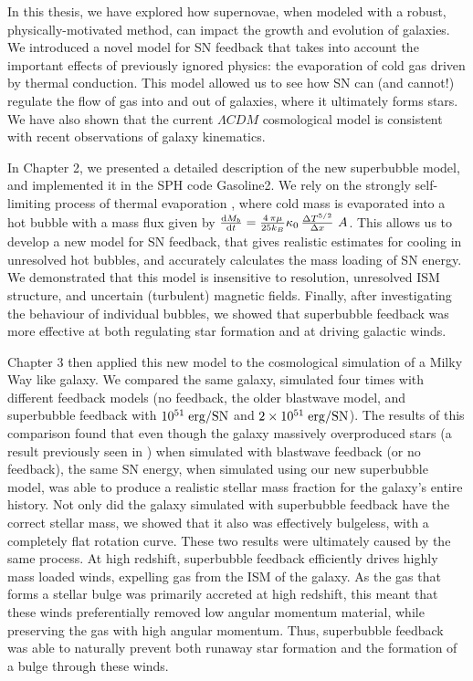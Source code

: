 In this thesis, we have explored how supernovae, when modeled with a robust,
physically-motivated method, can impact the growth and evolution of galaxies.
We introduced a novel model for SN feedback that takes into account the
important effects of previously ignored physics: the evaporation of cold gas
driven by thermal conduction.  This model allowed us to see how SN can (and
cannot!) regulate the flow of gas into and out of galaxies, where it ultimately
forms stars.  We have also shown that the current $\Lambda CDM$ cosmological
model is consistent with recent observations of galaxy kinematics.

In Chapter 2, we presented a detailed description of the new superbubble model,
and implemented it in the SPH code {\sc Gasoline2}.  We rely on the strongly
self-limiting process of thermal evaporation \citep{Cowie1977}, where cold mass
is evaporated into a hot bubble with a mass flux given by $ \frac{{\rm d
}M_b}{{\rm d}t} = \frac{4\,\pi\mu}{25k_B}\kappa_0\,\frac{\Delta T^{5/2}}{\Delta
x}\ A$. This allows us to develop a new model for SN feedback, that gives
realistic estimates for cooling in unresolved hot bubbles, and accurately
calculates the mass loading of SN energy.  We demonstrated that this model is
insensitive to resolution, unresolved ISM structure, and uncertain (turbulent)
magnetic fields.  Finally, after investigating the behaviour of individual
bubbles, we showed that superbubble feedback was more effective at both
regulating star formation and at driving galactic winds.

Chapter 3 then applied this new model to the cosmological simulation of a Milky
Way like galaxy.  We compared the same galaxy, simulated four times with
different feedback models (no feedback, the older \citet{Stinson2006} blastwave model,
and superbubble feedback with $10^{51}\;\rm{erg}/SN$ and
$2\times10^{51}\;\rm{erg}/SN$).  The results of this comparison found that even
though the galaxy massively overproduced stars (a result previously seen in
\citealt{Stinson2010}) when simulated with blastwave feedback (or no feedback),
the same SN energy, when simulated using our new superbubble model, was able to
produce a realistic stellar mass fraction for the galaxy's entire history.  Not
only did the galaxy simulated with superbubble feedback have the correct
stellar mass, we showed that it also was effectively bulgeless, with a
completely flat rotation curve.  These two results were ultimately caused by the
same process.  At high redshift, superbubble feedback efficiently drives highly
mass loaded winds, expelling gas from the ISM of the galaxy.  As the gas that
forms a stellar bulge was primarily accreted at high redshift, this meant that
these winds preferentially removed low angular momentum material, while
preserving the gas with high angular momentum.  Thus, superbubble
feedback was able to naturally prevent both runaway star formation and the
formation of a bulge through these winds.


